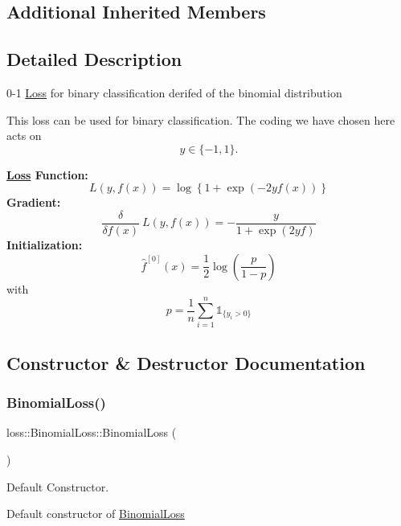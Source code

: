 \subsection*{Additional Inherited Members}


\subsection{Detailed Description}
0-\/1 \mbox{\hyperlink{classloss_1_1_loss}{Loss}} for binary classification derifed of the binomial distribution 

This loss can be used for binary classification. The coding we have chosen here acts on \[ y \in \{-1, 1\}. \]

{\bfseries \mbox{\hyperlink{classloss_1_1_loss}{Loss}} Function\+:} \[ L(y, f(x)) = \log\left\{1 + \exp\left(-2yf(x)\right)\right\} \] {\bfseries Gradient\+:} \[ \frac{\delta}{\delta f(x)}\ L(y, f(x)) = - \frac{y}{1 + \exp\left(2yf\right)} \] {\bfseries Initialization\+:} \[ \hat{f}^{[0]}(x) = \frac{1}{2}\log\left(\frac{p}{1 - p}\right) \] with \[ p = \frac{1}{n}\sum\limits_{i=1}^n\mathbb{1}_{\{y_i > 0\}} \] 

\subsection{Constructor \& Destructor Documentation}
\mbox{\label{classloss_1_1_binomial_loss_ab903b1364d0569c83b4f44d8c7af0f69}} 
\subsubsection{\texorpdfstring{Binomial\+Loss()}{BinomialLoss()}\hspace{0.1cm}{\footnotesize\ttfamily [1/2]}}
{\footnotesize\ttfamily loss\+::\+Binomial\+Loss\+::\+Binomial\+Loss (\begin{DoxyParamCaption}{ }\end{DoxyParamCaption})}



Default Constructor. 

Default constructor of {\ttfamily \mbox{\hyperlink{classloss_1_1_binomial_loss}{Binomial\+Loss}}} \mbox{\label{classloss_1_1_binomial_loss_aac60ad4791933f54fb9858e8d89ba6a5}} 
